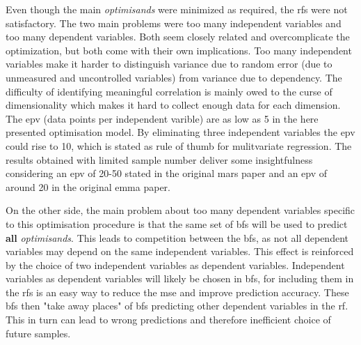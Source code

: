 Even though the main \textit{optimisands} were minimized as required, the \gls{rf}s were not satisfactory. 
The two main problems were too many independent variables and too many dependent variables. 
Both seem closely related and overcomplicate the optimization, but both come with their own implications. 
Too many independent variables make it harder to distinguish variance due to random error (due to unmeasured and uncontrolled variables) from variance due to dependency. %
The difficulty of identifying meaningful correlation is mainly owed to the curse of dimensionality\cite{friedman1988fitting} which makes it hard to collect enough data for each dimension. 
%
The \gls{epv} (data points per independent varible) are as low as 5 in the here presented optimisation model. %
By eliminating three independent variables the \gls{epv} could rise to 10, which is stated 
as rule of thumb for mulitvariate regression\cite{vittinghoff2007relaxing}. 
The results obtained with limited sample number deliver some insightfulness %
considering an \gls{epv} of 20-50 stated in the original \gls{mars} paper\cite{friedman1991multivariate} 
and an \gls{epv} of around 20 in the original \gls{emma} paper\cite{villanova2010function}. 
%

On the other side, the main problem about too many dependent variables specific to this optimisation procedure 
is that the same set of \gls{bf}s will be used to predict \textbf{all} \textit{optimisands}.
This leads to competition between the \gls{bf}s, as not all dependent variables may depend on the same independent variables. 
This effect is reinforced by the choice of two independent variables as dependent variables. %
Independent variables as dependent variables will likely be chosen in \gls{bf}s, 
for including them in the \gls{rf}s is an easy way to reduce the \gls{mse} and improve prediction accuracy.
These \gls{bf}s then "take away places" of \gls{bf}s predicting other dependent variables in the \gls{rf}. %
This in turn can lead to wrong predictions and therefore inefficient choice of future samples. 


